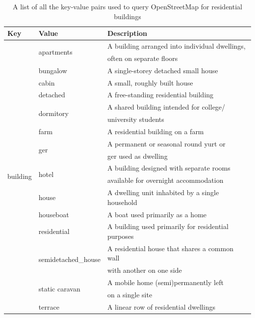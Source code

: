 \begin{table}[H]
\caption{A list of all the key-value pairs used to query OpenStreetMap for residential buildings \label{OSM_2}}
\begin{tabular}{l l l}
\toprule
\textbf{Key} & \textbf{Value} & \textbf{Description} \\
\midrule
\multirow{21}{*}{building} & \multirow{2}{*}{apartments} & A building arranged into individual dwellings, \\
& & often on separate floors \\
& bungalow & A single-storey detached small house \\
& cabin & A small, roughly built house \\
& detached & A free-standing residential building \\
& \multirow{2}{*}{dormitory} & A shared building intended for college/\\
& & university students \\
& farm & A residential building on a farm \\
& \multirow{2}{*}{ger} & A permanent or seasonal round yurt or \\
& & ger used as dwelling \\
& \multirow{2}{*}{hotel} & A building designed with separate rooms \\
& & available for overnight accommodation \\
& house & A dwelling unit inhabited by a single household \\
& houseboat & A boat used primarily as a home\\
& residential & A building used primarily for residential purposes \\
& \multirow{2}{*}{semidetached\_house} & A residential house that shares a common wall \\
& & with another on one side \\
& \multirow{2}{*}{static caravan} & A mobile home (semi)permanently left \\
& & on a single site \\
& terrace & A linear row of residential dwellings \\
\bottomrule
\end{tabular}
\end{table}
